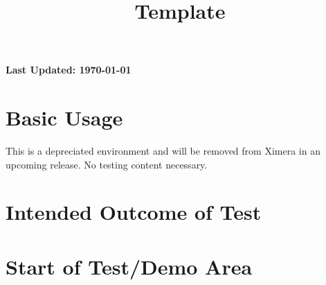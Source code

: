 \documentclass{ximera}
\title{Template}
\begin{document}
\begin{abstract}
    
\end{abstract}
\maketitle

{{\Huge \bfseries Last Updated: \today}} \\


\section{Basic Usage}

This is a depreciated environment and will be removed from Ximera in an upcoming release. No testing content necessary.

\section{Intended Outcome of Test}

\section{Start of Test/Demo Area}


\hrulefill
\end{document}
